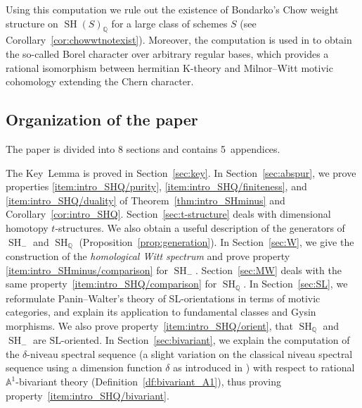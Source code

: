 \documentclass[JEP,XML,SOM,Unicode]{cedram}
\newcommand{\tstructures}{$t$-structures\xspace}
\renewcommand{\AA}{\mathbb A}
\newcommand{\SL}{\mathrm{SL}}
\DeclareMathOperator{\SH}{SH}
\newcommand{\QQ} {\mathbb Q}
\theoremstyle{remark}
\theoremstyle{definition}
\numberwithin{equation}{thm}
\begin{document}
Using this computation we rule out the existence of Bondarko's Chow weight structure on $\SH(S)_\QQ$ for a large class of schemes $S$ (see Corollary~\ref{cor:chowwtnotexist}).
Moreover, the computation is used in \cite{DF3} to obtain
the so-called Borel character over arbitrary regular bases, which provides
a rational isomorphism between hermitian K-theory and Milnor--Witt motivic cohomology extending the Chern character.

\subsection*{Organization of the paper}

The paper is divided into 8 sections and contains 5~appendices.

The Key~Lemma is proved in Section~\ref{sec:key}.
In Section~\ref{sec:abspur}, we prove properties \eqref{item:intro_SHQ/purity}, \eqref{item:intro_SHQ/finiteness}, and \eqref{item:intro_SHQ/duality} of Theorem~\ref{thm:intro_SHminus} and Corollary~\ref{cor:intro_SHQ}.
Section~\ref{sec:t-structure} deals with dimensional homotopy \tstructures.
We also obtain a useful description of the generators of $\SH_-$ and $\SH_\QQ$ (Proposition~\ref{prop:generation}).
In Section~\ref{sec:W}, we give the construction of the \emph{homological Witt spectrum} and prove property \eqref{item:intro_SHminus/comparison} for $\SH_-$.
Section~\ref{sec:MW} deals with the same property~\eqref{item:intro_SHQ/comparison} for $\SH_\QQ$.
In Section~\ref{sec:SL}, we reformulate Panin--Walter's theory of SL-orientations in terms of motivic categories, and explain its application to fundamental classes and Gysin morphisms.
We also prove property~\eqref{item:intro_SHQ/orient}, \ie that $\SH_\QQ$ and $\SH_-$ are $\SL$-oriented.
In Section~\ref{sec:bivariant}, we explain the computation of the $\delta$-niveau spectral sequence (a slight variation on the classical niveau spectral sequence using a dimension function $\delta$
as introduced in \cite{BD1}) with respect to rational $\AA^1$-bivariant theory (Definition~\ref{df:bivariant_A1}), thus proving property~\eqref{item:intro_SHQ/bivariant}.
\end{document}
